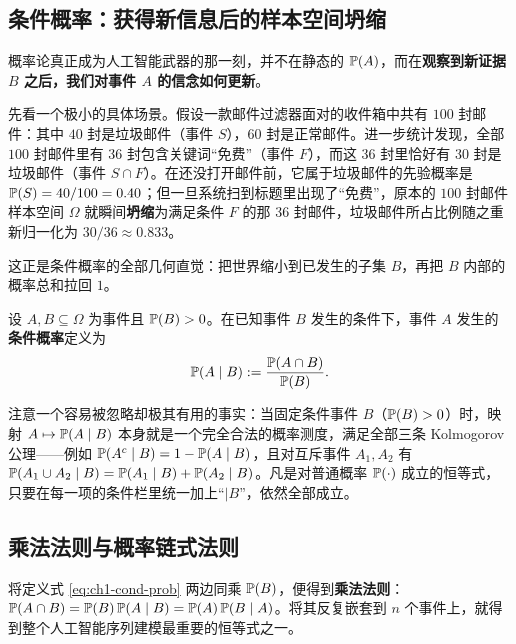 \subsection{条件概率：获得新信息后的样本空间坍缩}

概率论真正成为人工智能武器的那一刻，并不在静态的 $\mathbb{P}(A)$，而在\textbf{观察到新证据 $B$ 之后，我们对事件 $A$ 的信念如何更新}。

先看一个极小的具体场景。假设一款邮件过滤器面对的收件箱中共有 $100$ 封邮件：其中 $40$ 封是垃圾邮件（事件 $S$），$60$ 封是正常邮件。进一步统计发现，全部 $100$ 封邮件里有 $36$ 封包含关键词“免费”（事件 $F$），而这 $36$ 封里恰好有 $30$ 封是垃圾邮件（事件 $S \cap F$）。在还没打开邮件前，它属于垃圾邮件的先验概率是 $\mathbb{P}(S) = 40/100 = 0.40$；但一旦系统扫到标题里出现了“免费”，原本的 $100$ 封邮件样本空间 $\Omega$ 就瞬间\textbf{坍缩}为满足条件 $F$ 的那 $36$ 封邮件，垃圾邮件所占比例随之重新归一化为 $30/36 \approx 0.833$。

这正是条件概率的全部几何直觉：把世界缩小到已发生的子集 $B$，再把 $B$ 内部的概率总和拉回 $1$。

\begin{defBox}
\begin{definition}
\label{def:ch1-cond-prob}
设 $A, B \subseteq \Omega$ 为事件且 $\mathbb{P}(B) > 0$。在已知事件 $B$ 发生的条件下，事件 $A$ 发生的\textbf{条件概率}定义为
\begin{equation}
  \mathbb{P}(A \mid B) := \frac{\mathbb{P}(A \cap B)}{\mathbb{P}(B)}. \label{eq:ch1-cond-prob}
\end{equation}
\end{definition}
\end{defBox}

注意一个容易被忽略却极其有用的事实：当固定条件事件 $B$（$\mathbb{P}(B) > 0$）时，映射 $A \mapsto \mathbb{P}(A \mid B)$ 本身就是一个完全合法的概率测度，满足全部三条 Kolmogorov 公理——例如 $\mathbb{P}(A^c \mid B) = 1 - \mathbb{P}(A \mid B)$，且对互斥事件 $A_1, A_2$ 有 $\mathbb{P}(A_1 \cup A_2 \mid B) = \mathbb{P}(A_1 \mid B) + \mathbb{P}(A_2 \mid B)$。凡是对普通概率 $\mathbb{P}(\cdot)$ 成立的恒等式，只要在每一项的条件栏里统一加上“$\mid B$”，依然全部成立。

\subsection{乘法法则与概率链式法则}

将定义式 \eqref{eq:ch1-cond-prob} 两边同乘 $\mathbb{P}(B)$，便得到\textbf{乘法法则}：$\mathbb{P}(A \cap B) = \mathbb{P}(B)\,\mathbb{P}(A \mid B) = \mathbb{P}(A)\,\mathbb{P}(B \mid A)$。将其反复嵌套到 $n$ 个事件上，就得到整个人工智能序列建模最重要的恒等式之一。

